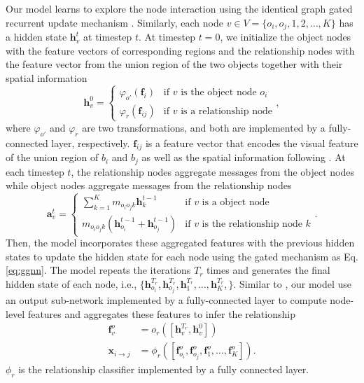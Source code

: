 \documentclass[10pt,twocolumn,letterpaper]{article}
\begin{document}
Our model learns to explore the node interaction using the identical graph gated recurrent update mechanism \cite{li2016gated}. Similarly, each node $v \in V=\{o_i, o_j, 1, 2, \dots, K\}$ has a hidden state $\mathbf{h}_v^t$ at timestep $t$. At timestep $t=0$, we initialize the object nodes with the feature vectors of corresponding regions and the relationship nodes with the feature vector from the union region of the two objects together with their spatial information
\begin{equation}
\mathbf{h}^0_v=
\begin{cases}
\varphi_{o'}(\mathbf{f}_i) & \text{if $v$ is the object node $o_i$}\\
\varphi_r(\mathbf{f}_{ij}) & \text{if $v$ is a relationship node}
\end{cases},
\end{equation}
where $\varphi_{o'}$ and $\varphi_r$ are two transformations, and both are implemented by a fully-connected layer, respectively. $\mathbf{f}_{ij}$ is a feature vector that encodes the visual feature of the union region of $b_i$ and $b_j$ as well as the spatial information following \cite{zellers2017neural}. At each timestep $t$, the relationship nodes aggregate messages from the object nodes while object nodes aggregate messages from the relationship nodes
\begin{equation}
\mathbf{a}^t_v=
\begin{cases}
\sum_{k=1}^K m_{{o_i}{o_j}{k}}\mathbf{h}_{k}^{t-1}& \text{if $v$ is a object node}\\
 m_{{o_i}{o_j}{k}}(\mathbf{h}_{o_i}^{t-1}+\mathbf{h}_{o_j}^{t-1})& \text{if $v$ is the relationship node $k$}
\end{cases}.
\end{equation}
Then, the model incorporates these aggregated features with the previous hidden states to update the hidden state for each node using the gated mechanism as Eq. \ref{eq:ggnn}. The model repeats the iterations $T_r$ times and generates the final hidden state of each node, i.e., $\{\mathbf{h}_{o_i}^{T_r}, \mathbf{h}_{o_j}^{T_r}, \mathbf{h}_{1}^{T_r}, \dots, \mathbf{h}_{K}^{T_r},\}$. Similar to \cite{li2016gated}, our model use an output sub-network implemented by a fully-connected layer to compute node-level features and aggregates these features to infer the relationship
\begin{equation}
   \begin{split}
   \mathbf{f}_v^o&=o_r([\mathbf{h}_v^{T_r}, \mathbf{h}_v^0]) \\
   \mathbf{x}_{i \rightarrow j}&=\phi_{r}([\mathbf{f}_{o_i}^o, \mathbf{f}_{o_j}^o, \mathbf{f}_{1}^o, \dots, \mathbf{f}_{K}^o]).
   \end{split}
   \label{eq:relationship-cls}
\end{equation}
$\phi_{r}$ is the relationship classifier implemented by a fully connected layer.
\end{document}
